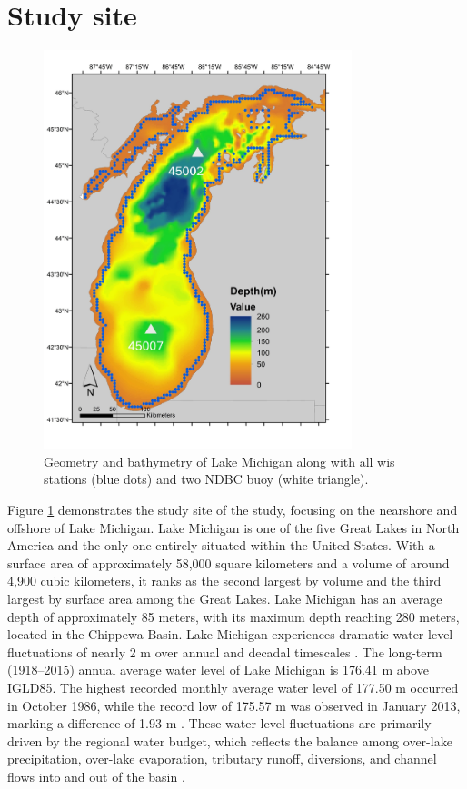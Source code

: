 \section{Study site}
\label{c4_study_site}

\begin{figure}[htbp]
  \centering
  \includegraphics[width=0.8\textwidth]{chapter4/resources/figure4-1.jpg}
  \caption{Geometry and bathymetry of Lake Michigan along with all wis stations
  (blue dots) and two NDBC buoy (white triangle).}
  \label{fig:fig4.1}
\end{figure}

Figure \ref{fig:fig4.1} demonstrates the study site of the study, focusing on
the nearshore and offshore of Lake Michigan. Lake Michigan is one of the five
Great Lakes in North America and the only one entirely situated within the
United States. With a surface area of approximately 58,000 square kilometers and
a volume of around 4,900 cubic kilometers, it ranks as the second largest by
volume and the third largest by surface area among the Great Lakes. Lake
Michigan has an average depth of approximately 85 meters, with its maximum depth
reaching 280 meters, located in the Chippewa Basin. Lake Michigan experiences
dramatic water level fluctuations of nearly 2 m over annual and decadal
timescales \citep{quinn1990lake,gronewold2014water}. The long-term (1918–2015)
annual average water level of Lake Michigan is 176.41 m above IGLD85. The
highest recorded monthly average water level of 177.50 m occurred in October
1986, while the record low of 175.57 m was observed in January 2013, marking a
difference of 1.93 m \citep{gronewold2013dynamic}. These water level
fluctuations are primarily driven by the regional water budget, which reflects
the balance among over-lake precipitation, over-lake evaporation, tributary
runoff, diversions, and channel flows into and out of the basin
\citep{gronewold_hydrological_2016}.

